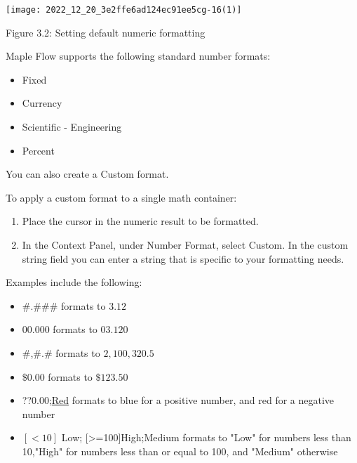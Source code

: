 \begin{center}
\texttt{[image: 2022\_12\_20\_3e2ffe6ad124ec91ee5cg-16(1)]}
\end{center}

Figure 3.2: Setting default numeric formatting

Maple Flow supports the following standard number formats:

\begin{itemize}
  \item Fixed

  \item Currency

  \item Scientific - Engineering

  \item Percent

\end{itemize}

You can also create a Custom format.

To apply a custom format to a single math container:

\begin{enumerate}
  \item Place the cursor in the numeric result to be formatted.

  \item In the Context Panel, under Number Format, select Custom. In the custom string field you can enter a string that is specific to your formatting needs.

\end{enumerate}

Examples include the following:

\begin{itemize}
  \item \#.\#\#\# formats to $3.12$

  \item $00.000$ formats to $03.120$

  \item \#,\#.\# formats to $2,100,320.5$

  \item $\$ 0.00$ formats to $\$ 123.50$

  \item ??0.00;\href{??0.00}{Red} formats to blue for a positive number, and red for a negative number

  \item $[<10]$ Low; [>=100]High;Medium formats to "Low" for numbers less than 10,"High" for numbers less than or equal to 100, and "Medium" otherwise

\end{itemize}

